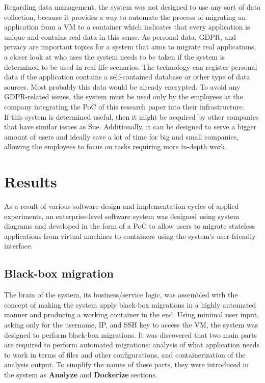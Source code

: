 \documentclass[twocolumn]{article}
\begin{document}
Regarding data management, the system was not designed to use any sort of data collection, because it provides a way to automate the process of migrating an application from a VM to a container which indicates that every application is unique and contains real data in this sense. As personal data, GDPR, and privacy are important topics for a system that aims to migrate real applications, a closer look at who uses the system needs to be taken if the system is determined to be used in real-life scenarios. The technology can register personal data if the application contains a self-contained database or other type of data sources. Most probably this data would be already encrypted. To avoid any GDPR-related issues, the system must be used only by the employees at the company integrating the PoC of this research paper into their infrastructure.\\ 

If this system is determined useful, then it might be acquired by other companies that have similar issues as Sue. Additionally, it can be designed to serve a bigger amount of users and ideally save a lot of time for big and small companies, allowing the employees to focus on tasks requiring more in-depth work.

\section{Results}
 As a result of various software design and implementation cycles of applied experiments, an enterprise-level software system was designed using system diagrams and developed in the form of a PoC to allow users to migrate stateless applications from virtual machines to containers using the system's user-friendly interface.

\subsection{Black-box migration}
The brain of the system, its business/service logic, was assembled with the concept of making the system apply black-box migrations in a highly automated manner and producing a working container in the end. Using minimal user input, asking only for the username, IP, and SSH key to access the VM, the system was designed to perform black-box migrations. It was discovered that two main parts are required to perform automated migrations: analysis of what application needs to work in terms of files and other configurations, and containerization of the analysis output. To simplify the names of these parts, they were introduced in the system as \textbf{Analyze} and \textbf{Dockerize} sections. \\
\end{document}

